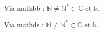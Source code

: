 \documentclass[a4paper,10pt]{article}
\newcommand{\field}[1]{\mathbb{#1}}
\newcommand{\N}{\field{N}}
\newcommand{\Nstar}{\field{N}^{\text{*}}}
\newcommand{\CC}{\field{C}}
\newcommand{\kk}{\field{k}}
\newcommand{\fieldb}[1]{\mathds{#1}}
\newcommand{\NN}{\fieldb{N}}
\newcommand{\NNstar}{\fieldb{N}^{\text{*}}}
\newcommand{\CCb}{\fieldb{C}}
\newcommand{\kkb}{\fieldb{k}}
\begin{document}
Via mathbb : $\N \neq \Nstar \subset \CC$ et $\kk$.


Via mathds : $\NN \neq \NNstar \subset \CCb$ et $\kkb$.
\end{document}
